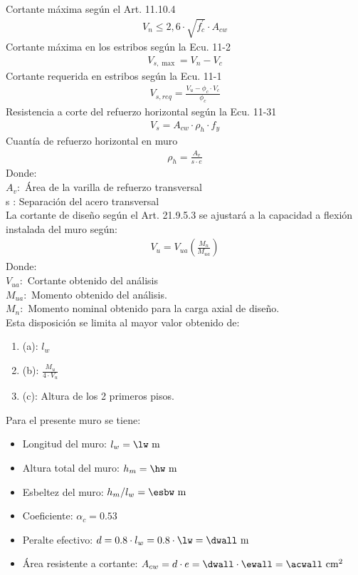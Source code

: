 Cortante máxima según el Art. 11.10.4
\begin{align}
    V_{n} \leq 2,6 \cdot \sqrt{f_{c}^{\prime}} \cdot A_{c w}
\end{align}
Cortante máxima en los estribos según la Ecu. 11-2
\begin{align}
    V_{s, \max }=V_{n}-V_{c}
\end{align}
Cortante requerida en estribos según la Ecu. 11-1
\begin{align}
    V_{s, r e q}=\frac{V_{u}-\phi_{c} \cdot V_{c}}{\phi_{c}}
\end{align}
Resistencia a corte del refuerzo horizontal según la Ecu. 11-31
\begin{align}
    V_{s}=A_{c w} \cdot \rho_{h} \cdot f_{y}
\end{align}
Cuantía de refuerzo horizontal en muro
\begin{align}
    \rho_{h}=\frac{A_{v}}{s \cdot e}
\end{align}
\noindent
Donde:\\
$A_{v}:$ Área de la varilla de refuerzo transversal\\
s : Separación del acero transversal\\
\noindent
La cortante de diseño según el Art. 21.9.5.3 se ajustará a la capacidad a flexión instalada del muro según:
\begin{align}
    V_{u}=V_{u a}\left(\frac{M_{n}}{M_{u a}}\right)
\end{align}
\noindent
Donde:\\
$V_{u a}:$ Cortante obtenido del análisis\\
$M_{u a}:$ Momento obtenido del análisis.\\
$M_{n}:$ Momento nominal obtenido para la carga axial de diseño.\\
\noindent
Esta disposición se limita al mayor valor obtenido de:
\begin{enumerate}
\item[] (a): $l_{w}$
\item[] (b): $\displaystyle\frac{M_{u}}{4 \cdot V_{u}}$
\item[] (c): Altura de los 2 primeros pisos.
\end{enumerate}
\noindent
Para el presente muro se tiene:
\FPset{}
\FPset{}
\begin{itemize}
    \item Longitud del muro: $l_{w}=\lw\mathrm{~m}$
    \item Altura total del muro: $h_{m}=\hw\mathrm{~m}$
    \item Esbeltez del muro: $h_{m}/l_{w}=\esbw\mathrm{~m}$
    \item Coeficiente: $\alpha_{c}=0.53 $
    \item Peralte efectivo: $d=0.8\cdot l_{w}=0.8\cdot\lw=\dwall \mathrm{~m}$
    \item Área resistente a cortante: $A_{c w}=d \cdot e=\dwall \cdot\ewall= \acwall\mathrm{~cm^2}$
\end{itemize}

